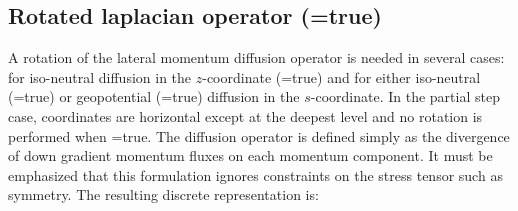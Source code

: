 \documentclass[NEMO_book]{subfiles}
\begin{document}
\subsection   [Rotated laplacian operator (\np{ln\_dynldf\_iso}) ]
			{Rotated laplacian operator (=true)}
\label{DYN_ldf_iso}

A rotation of the lateral momentum diffusion operator is needed in several cases: 
for iso-neutral diffusion in the $z$-coordinate (=true) and for 
either iso-neutral (=true) or geopotential 
(=true) diffusion in the $s$-coordinate. In the partial step 
case, coordinates are horizontal except at the deepest level and no 
rotation is performed when =true. The diffusion operator 
is defined simply as the divergence of down gradient momentum fluxes on each 
momentum component. It must be emphasized that this formulation ignores 
constraints on the stress tensor such as symmetry. The resulting discrete 
representation is:
\end{document}
